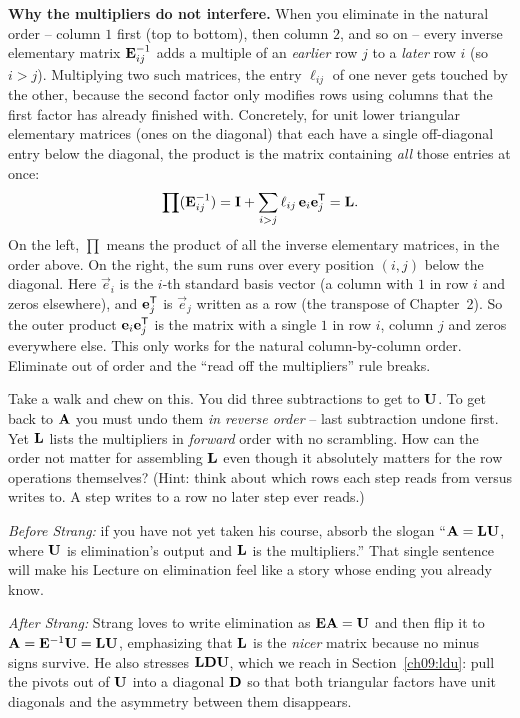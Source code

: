 \begin{formalbox}
\textbf{Why the multipliers do not interfere.} When you eliminate in the natural order --
column $1$ first (top to bottom), then column $2$, and so on -- every inverse elementary
matrix $\mathbf{E}_{ij}^{-1}$ adds a multiple of an \emph{earlier} row $j$ to a \emph{later} row
$i$ (so $i>j$). Multiplying two such matrices, the entry $\ell_{ij}$ of one never gets
touched by the other, because the second factor only modifies rows using columns that the
first factor has already finished with. Concretely, for unit lower triangular elementary
matrices (ones on the diagonal) that each have a single off-diagonal entry below the
diagonal, the product is the matrix containing \emph{all} those entries at once:
\[
  \prod (\mathbf{E}_{ij}^{-1}) = \mathbf{I} + \sum_{i>j} \ell_{ij}\,\mathbf{e}_i \mathbf{e}_j^{\mathsf{T}} = \mathbf{L}.
\]
On the left, $\prod$ means the product of all the inverse elementary matrices, in the order
above. On the right, the sum runs over every position $(i,j)$ below the diagonal. Here
$\vec{e}_i$ is the $i$-th standard basis vector (a column with $1$ in row $i$ and zeros
elsewhere), and $\mathbf{e}_j^{\mathsf{T}}$ is $\vec{e}_j$ written as a row (the transpose of
Chapter~2). So the outer product $\mathbf{e}_i \mathbf{e}_j^{\mathsf{T}}$ is the
matrix with a single $1$ in row $i$, column $j$ and zeros everywhere else. This only works for
the natural column-by-column order. Eliminate out of order and the
``read off the multipliers'' rule breaks.
\end{formalbox}

\begin{walkbox}
Take a walk and chew on this. You did three subtractions to get to $\mathbf{U}$. To get back
to $\mathbf{A}$ you must undo them \emph{in reverse order} -- last subtraction undone first.
Yet $\mathbf{L}$ lists the multipliers in \emph{forward} order with no scrambling. How can the
order not matter for assembling $\mathbf{L}$ even though it absolutely matters for the row
operations themselves? (Hint: think about which rows each step reads from versus writes to.
A step writes to a row no later step ever reads.)
\end{walkbox}

\begin{strangbox}
\emph{Before Strang:} if you have not yet taken his course, absorb the slogan
``$\mathbf{A}=\mathbf{L}\mathbf{U}$, where $\mathbf{U}$ is elimination's output and $\mathbf{L}$ is the
multipliers.'' That single sentence will make his Lecture on elimination feel like a story
whose ending you already know.

\emph{After Strang:} Strang loves to write elimination as
$\mathbf{E}\mathbf{A}=\mathbf{U}$ and then flip it to $\mathbf{A}=\mathbf{E}^{-1}\mathbf{U}=\mathbf{L}\mathbf{U}$,
emphasizing that $\mathbf{L}$ is the \emph{nicer} matrix because no minus signs survive. He
also stresses $\mathbf{LDU}$, which we reach in
Section~\ref{ch09:ldu}: pull the pivots out of $\mathbf{U}$ into a diagonal $\mathbf{D}$ so that
both triangular factors have unit diagonals and the asymmetry between them disappears.
\end{strangbox}

